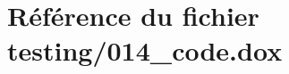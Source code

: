 \hypertarget{014__code_8dox}{}\section{Référence du fichier testing/014\+\_\+code.dox}
\label{014__code_8dox}
